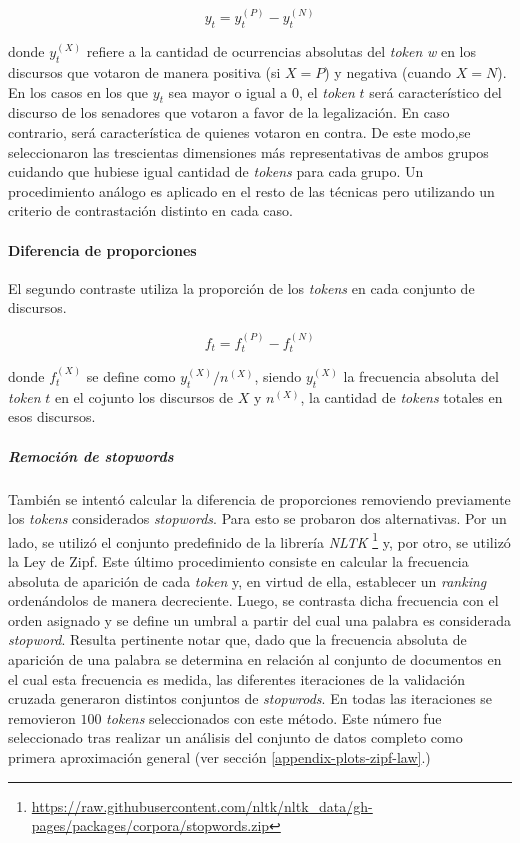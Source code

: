 \begin{equation}
y_t = y_{t}^{(P)}-y_{t}^{(N)}
\end{equation}

donde $y_{t}^{(X)}$ refiere a la cantidad de ocurrencias absolutas del \textit{token}
\textit{w} en los discursos que votaron de manera positiva
(si $X=P$) y negativa (cuando $X=N$).
En los casos en los que $y_{t}$ sea mayor o igual a $0$, el \textit{token} $t$
ser\'a caracter\'istico del discurso de los senadores que votaron a favor de
la legalizaci\'on. En caso contrario, ser\'a caracter\'istica de quienes votaron
en contra.
De este modo,se seleccionaron las trescientas dimensiones más representativas de
ambos grupos cuidando que hubiese igual cantidad de \textit{tokens} para cada grupo.
Un procedimiento análogo es aplicado en el resto de las técnicas pero utilizando
un criterio de contrastación distinto en cada caso.

\paragraph{Diferencia de proporciones}
\label{paragraph-methods-proportions}
El segundo contraste utiliza la proporci\'on de los \textit{tokens}
en cada conjunto de discursos.

\begin{equation}
    f_t = f_{t}^{(P)}-f_{t}^{(N)}
\end{equation}


donde $f_{t}^{(X)}$ se define como $y_{t}^{(X)} / n^{(X)}$, siendo $y_{t}^{(X)}$
la frecuencia absoluta del \textit{token} $t$ en el cojunto los discursos de $X$
y $n^{(X)}$, la cantidad de \textit{tokens} totales en esos discursos.

\subparagraph{Remoción de \textit{stopwords}}
\label{paragraph-methods-proportions-stopwords}
También se intentó calcular la diferencia de proporciones removiendo
previamente los \textit{tokens} considerados \textit{stopwords}.
Para esto se probaron dos alternativas.
Por un lado, se utiliz\'o el conjunto predefinido de la librer\'ia \textit{NLTK}
\footnote{\url{https://raw.githubusercontent.com/nltk/nltk_data/gh-pages/packages/corpora/stopwords.zip}}
y, por otro, se utilizó la Ley de Zipf.
Este último procedimiento consiste en calcular la frecuencia absoluta de aparición de
cada \textit{token} y, en virtud de ella, establecer un \textit{ranking}
ordenándolos de manera decreciente.
Luego, se contrasta dicha frecuencia con el orden asignado y se define
un umbral a partir del cual una palabra es considerada \textit{stopword}.
Resulta pertinente notar que, dado que la frecuencia absoluta de aparición
de una palabra se determina en relación al conjunto de documentos en el cual
esta frecuencia es medida, las diferentes iteraciones de la validación cruzada
generaron distintos conjuntos de \textit{stopwrods}.
En todas las iteraciones se removieron $100$ \textit{tokens} seleccionados
con este método. Este número fue seleccionado tras realizar un análisis del
conjunto de datos completo como primera aproximación general (ver sección
\ref{appendix-plots-zipf-law}.)

